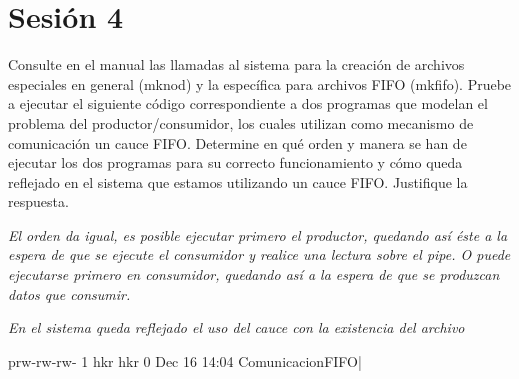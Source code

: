 \chapter{Sesión 4}

\begin{exercise}
Consulte en el manual las llamadas al sistema para la creación de archivos
especiales en general (mknod) y la específica para archivos FIFO (mkfifo). Pruebe a ejecutar
el siguiente código correspondiente a dos programas que modelan el problema del
productor/consumidor, los cuales utilizan como mecanismo de comunicación un cauce FIFO.
Determine en qué orden y manera se han de ejecutar los dos programas para su correcto
funcionamiento y cómo queda reflejado en el sistema que estamos utilizando un cauce FIFO.
Justifique la respuesta.

\emph{El orden da igual, es posible ejecutar primero el productor, quedando así éste
a la espera de que se ejecute el consumidor y realice una lectura sobre el pipe. O puede
ejecutarse primero en consumidor, quedando así a la espera de que se produzcan datos que
consumir.}

\emph{En el sistema queda reflejado el uso del cauce con la existencia del archivo}
\begin{bashcode}
prw-rw-rw-  1 hkr hkr      0 Dec 16 14:04 ComunicacionFIFO|
\end{bashcode}
\end{exercise}

